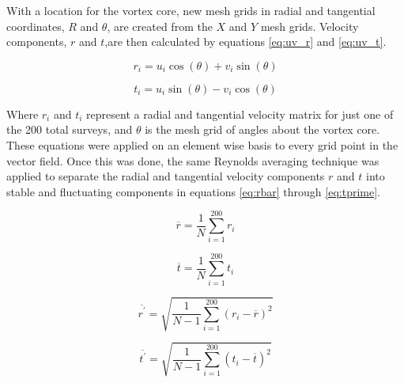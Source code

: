 With a location for the vortex core, new mesh grids in radial and tangential 
coordinates, $R$ and $\theta$, are created from the $X$ and 
$Y$ mesh grids. Velocity components, $r$ and $t$,are then 
calculated by equations \ref{eq:uv_r} and \ref{eq:uv_t}.

\begin{equation}
r_i = u_i \cos{(\theta)} + v_i \sin{(\theta)}
\label{eq:uv_r}
\end{equation}

\begin{equation}
t_i = u_i \sin{(\theta)} - v_i \cos{(\theta)}
\label{eq:uv_t}
\end{equation}

Where $r_i$ and $t_i$ represent a radial and tangential velocity matrix for 
just one of the 200 total surveys, and $\theta$ is the mesh grid of angles 
about the vortex core. These equations were applied on an element wise basis to 
every grid point in the vector field. Once this was done, the same Reynolds 
averaging technique was applied to separate the radial and tangential velocity 
components $r$ and $t$ into stable and fluctuating components in equations 
\ref{eq:rbar} through \ref{eq:tprime}.

\begin{equation}
\overline{r}  = \frac{1}{N} \sum_{i=1}^{200} r_i
\label{eq:rbar}
\end{equation}

\begin{equation}
\overline{t}  = \frac{1}{N} \sum_{i=1}^{200} t_i
\label{eq:tbar}
\end{equation}

\begin{equation}
\overline{r^\prime} = \sqrt{\frac{1}{N-1} \sum_{i=1}^{200} (r_i - 
\overline{r})^2}
\label{eq:rprime}
\end{equation}

\begin{equation}
\overline{t^\prime} = \sqrt{\frac{1}{N-1} \sum_{i=1}^{200} (t_i - 
\overline{t})^2}
\label{eq:tprime}
\end{equation}

